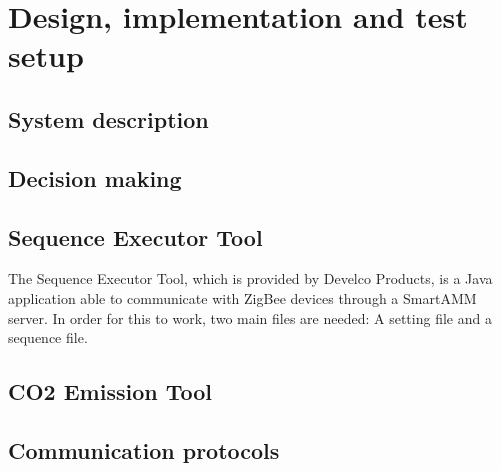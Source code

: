 \documentclass[Main]{subfiles}
\begin{document}
\section{Design, implementation and test setup} %
\label{sec:design_implementation_test_setup}

	\subsection{System description}


	\subsection{Decision making}



	\subsection{Sequence Executor Tool}
		The Sequence Executor Tool, which is provided by Develco Products, is a Java application able to communicate with ZigBee devices through a SmartAMM server.
		In order for this to work, two main files are needed: A setting file and a sequence file.
		


	\subsection{CO2 Emission Tool}



	\subsection{Communication protocols}



\end{document}
